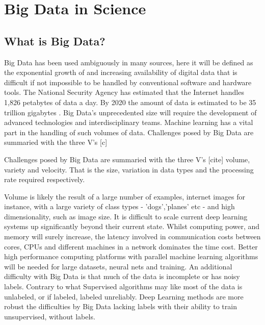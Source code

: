 
\chapter{Big Data in Science} %

\label{Chapter4} %




\section{What is Big Data?}



Big Data has been used ambiguously in many sources, here it will be defined as the  exponential growth of  and increasing availability of digital data that is difficult if not impossible to be handled by conventional software and hardware tools\citep{chen2014big}.
The National Security Agency has estimated that the Internet handles 1,826 petabytes of data a day\citep{chen2014big}.
By 2020 the amount of data is estimated to be 35 trillion gigabytes \citep{chen2014big}.
Big Data's unprecedented size will require the development of advanced technologies and interdisciplinary teams.
Machine learning has a vital part in the handling of such volumes of data.
Challenges posed by Big Data are summaried with the three V's [c]

Challenges posed by Big Data are summaried with the three V's [cite]\citep{chen2014big} volume, variety and velocity.
That is the size, variation in data types and the processing rate required respectively.

Volume is likely the result of a large number of examples, internet images for instance, with a large variety of class types - 'dogs','planes' etc - and high dimensionality, such as image size.
It is difficult to scale current deep learning systems up significantly beyond their current state.
Whilst computing power, and memory will surely increase, the latency involved in communication costs between cores, CPUs and different machines in a network dominates the time cost.
Better high performance computing platforms with parallel machine learning algorithms will be needed for large datasets, neural nets and training.
An additional difficulty with Big Data is that much of the data is incomplete or has noisy labels.
Contrary to what Supervised algorithms may like most of the data is unlabeled, or if labeled, labeled unreliably.
Deep Learning methods are more robust the difficulties by Big Data lacking labels with their ability to train unsupervised, without labels.

